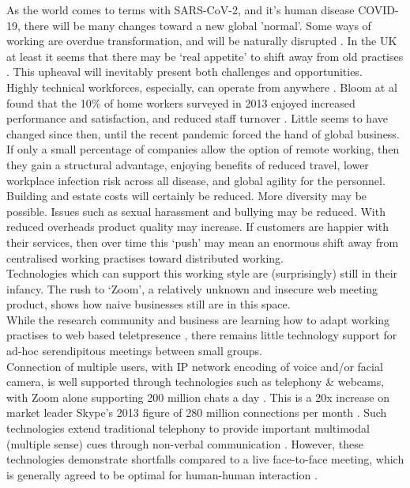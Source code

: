 As the world comes to terms with SARS-CoV-2, and it's human disease COVID-19, there will be many changes toward a new global 'normal'. Some ways of working are overdue transformation, and will be naturally disrupted \cite{centralinertia}. In the UK at least it seems that there may be `real appetite' to shift away from old practises \cite{skychange}. This upheaval will inevitably present both challenges and opportunities.\\
Highly technical workforces, especially, can operate from anywhere \cite{globalworkplace}. Bloom at al found that the 10\% of home workers surveyed in 2013 enjoyed increased performance and satisfaction, and reduced staff turnover \cite{bloom2015does}. Little seems to have changed since then, until the recent pandemic forced the hand of global business. If only a small percentage of companies allow the option of remote working, then they gain a structural advantage, enjoying benefits of reduced travel, lower workplace infection risk across all disease, and global agility for the personnel. Building and estate costs will certainly be reduced. More diversity may be possible. Issues such as sexual harassment and bullying may be reduced.  With reduced overheads product quality may increase. If customers are happier with their services, then over time this `push' may mean an enormous shift away from centralised working practises toward distributed working. \\
Technologies which can support this working style are (surprisingly) still in their infancy. The rush to `Zoom', a relatively unknown and insecure \cite{aiken2020zooming} web meeting product, shows how naive businesses still are in this space. \\
While the research community and business are learning how to adapt working practises to web based teletpresence \cite{oeppen2020human}, there remains little technology support for ad-hoc serendipitous meetings between small groups. \\
Connection of multiple users, with IP network encoding of voice and/or facial camera, is well supported through technologies such as telephony \& webcams, with Zoom alone supporting 200 million chats a day \cite{zoomblog}. This is a 20x increase on market leader Skype's 2013 figure of 280 million connections per month \cite{SkypeStats}. Such technologies extend traditional telephony to provide important multimodal (multiple sense) cues through non-verbal communication \cite{Argyle1976, Wolff2008}.  However, these technologies demonstrate shortfalls compared to a live face-to-face meeting, which is generally agreed to be optimal for human-human interaction \cite{Wolff2008, 2002}.\\

